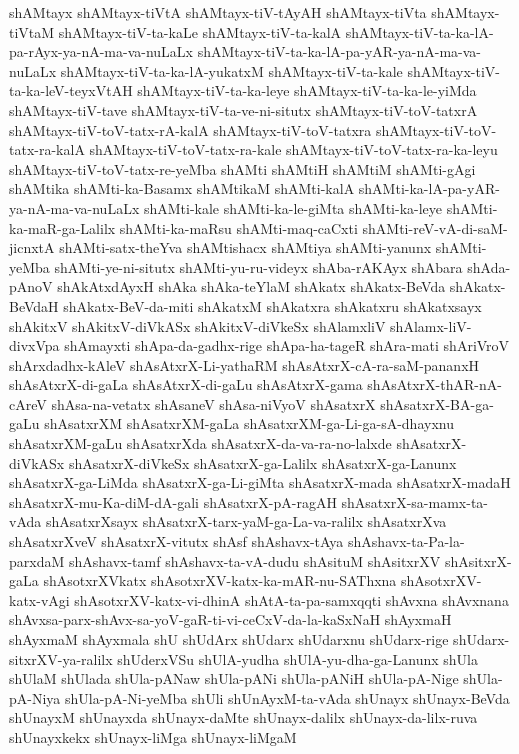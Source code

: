 {shAMtayx
shAMtayx-tiVtA
shAMtayx-tiV-tAyAH
shAMtayx-tiVta
shAMtayx-tiVtaM
shAMtayx-tiV-ta-kaLe
shAMtayx-tiV-ta-kalA
shAMtayx-tiV-ta-ka-lA-pa-rAyx-ya-nA-ma-va-nuLaLx
shAMtayx-tiV-ta-ka-lA-pa-yAR-ya-nA-ma-va-nuLaLx
shAMtayx-tiV-ta-ka-lA-yukatxM
shAMtayx-tiV-ta-kale
shAMtayx-tiV-ta-ka-leV-teyxVtAH
shAMtayx-tiV-ta-ka-leye
shAMtayx-tiV-ta-ka-le-yiMda
shAMtayx-tiV-tave
shAMtayx-tiV-ta-ve-ni-situtx
shAMtayx-tiV-toV-tatxrA
shAMtayx-tiV-toV-tatx-rA-kalA
shAMtayx-tiV-toV-tatxra
shAMtayx-tiV-toV-tatx-ra-kalA
shAMtayx-tiV-toV-tatx-ra-kale
shAMtayx-tiV-toV-tatx-ra-ka-leyu
shAMtayx-tiV-toV-tatx-re-yeMba
shAMti
shAMtiH
shAMtiM
shAMti-gAgi
shAMtika
shAMti-ka-Basamx
shAMtikaM
shAMti-kalA
shAMti-ka-lA-pa-yAR-ya-nA-ma-va-nuLaLx
shAMti-kale
shAMti-ka-le-giMta
shAMti-ka-leye
shAMti-ka-maR-ga-Lalilx
shAMti-ka-maRsu
shAMti-maq-caCxti
shAMti-reV-vA-di-saM-jicnxtA
shAMti-satx-theYva
shAMtishacx
shAMtiya
shAMti-yanunx
shAMti-yeMba
shAMti-ye-ni-situtx
shAMti-yu-ru-videyx
shAba-rAKAyx
shAbara
shAda-pAnoV
shAkAtxdAyxH
shAka
shAka-teYlaM
shAkatx
shAkatx-BeVda
shAkatx-BeVdaH
shAkatx-BeV-da-miti
shAkatxM
shAkatxra
shAkatxru
shAkatxsayx
shAkitxV
shAkitxV-diVkASx
shAkitxV-diVkeSx
shAlamxliV
shAlamx-liV-divxVpa
shAmayxti
shApa-da-gadhx-rige
shApa-ha-tageR
shAra-mati
shAriVroV
shArxdadhx-kAleV
shAsAtxrX-Li-yathaRM
shAsAtxrX-cA-ra-saM-pananxH
shAsAtxrX-di-gaLa
shAsAtxrX-di-gaLu
shAsAtxrX-gama
shAsAtxrX-thAR-nA-cAreV
shAsa-na-vetatx
shAsaneV
shAsa-niVyoV
shAsatxrX
shAsatxrX-BA-ga-gaLu
shAsatxrXM
shAsatxrXM-gaLa
shAsatxrXM-ga-Li-ga-sA-dhayxnu
shAsatxrXM-gaLu
shAsatxrXda
shAsatxrX-da-va-ra-no-lalxde
shAsatxrX-diVkASx
shAsatxrX-diVkeSx
shAsatxrX-ga-Lalilx
shAsatxrX-ga-Lanunx
shAsatxrX-ga-LiMda
shAsatxrX-ga-Li-giMta
shAsatxrX-mada
shAsatxrX-madaH
shAsatxrX-mu-Ka-diM-dA-gali
shAsatxrX-pA-ragAH
shAsatxrX-sa-mamx-ta-vAda
shAsatxrXsayx
shAsatxrX-tarx-yaM-ga-La-va-ralilx
shAsatxrXva
shAsatxrXveV
shAsatxrX-vitutx
shAsf
shAshavx-tAya
shAshavx-ta-Pa-la-parxdaM
shAshavx-tamf
shAshavx-ta-vA-dudu
shAsituM
shAsitxrXV
shAsitxrX-gaLa
shAsotxrXVkatx
shAsotxrXV-katx-ka-mAR-nu-SAThxna
shAsotxrXV-katx-vAgi
shAsotxrXV-katx-vi-dhinA
shAtA-ta-pa-samxqqti
shAvxna
shAvxnana
shAvxsa-parx-shAvx-sa-yoV-gaR-ti-vi-ceCxV-da-la-kaSxNaH
shAyxmaH
shAyxmaM
shAyxmala
shU
shUdArx
shUdarx
shUdarxnu
shUdarx-rige
shUdarx-sitxrXV-ya-ralilx
shUderxVSu
shUlA-yudha
shUlA-yu-dha-ga-Lanunx
shUla
shUlaM
shUlada
shUla-pANaw
shUla-pANi
shUla-pANiH
shUla-pA-Nige
shUla-pA-Niya
shUla-pA-Ni-yeMba
shUli
shUnAyxM-ta-vAda
shUnayx
shUnayx-BeVda
shUnayxM
shUnayxda
shUnayx-daMte
shUnayx-dalilx
shUnayx-da-lilx-ruva
shUnayxkekx
shUnayx-liMga
shUnayx-liMgaM
}
